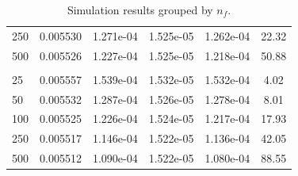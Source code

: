 \begin{table}[tph]
\begin{tabular}{lccccc}
     250 & 0.005530 & 1.271e-04 & 1.525e-05 & 1.262e-04 & 22.32 \\
     500 & 0.005526 & 1.227e-04 & 1.525e-05 & 1.218e-04 & 50.88 \\
    \addlinespace
    \multicolumn{6}{l}{$n_f = 800$, $\text{Reference Price} = 0.005404$} \\
      25 & 0.005557 & 1.539e-04 & 1.532e-05 & 1.532e-04 & 4.02 \\
      50 & 0.005532 & 1.287e-04 & 1.526e-05 & 1.278e-04 & 8.01 \\
     100 & 0.005525 & 1.226e-04 & 1.524e-05 & 1.217e-04 & 17.93 \\
     250 & 0.005517 & 1.146e-04 & 1.522e-05 & 1.136e-04 & 42.05 \\
     500 & 0.005512 & 1.090e-04 & 1.522e-05 & 1.080e-04 & 88.55 \\
    \hline
  \end{tabular}
  \caption{Simulation results grouped by $n_f$.}
  \label{tab:sim_results}
\end{table}
